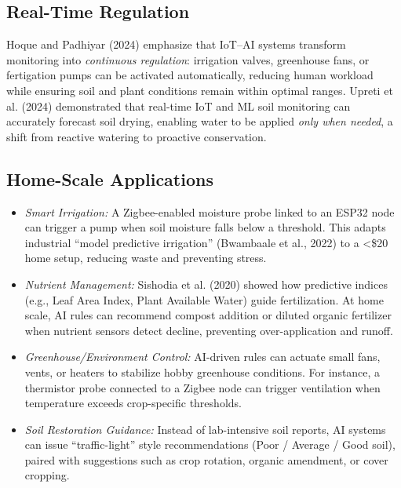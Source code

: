 \documentclass{sigchi}
\begin{document}
\subsection{Real-Time Regulation}

Hoque and Padhiyar (2024) emphasize that IoT–AI systems transform monitoring into \emph{continuous regulation}: irrigation valves, greenhouse fans, or fertigation pumps can be activated automatically, reducing human workload while ensuring soil and plant conditions remain within optimal ranges.
Upreti et al. (2024) demonstrated that real-time IoT and ML soil monitoring can accurately forecast soil drying, enabling water to be applied \emph{only when needed}, a shift from reactive watering to proactive conservation.

\subsection{Home-Scale Applications}

\begin{itemize}
\item \emph{Smart Irrigation:} A Zigbee-enabled moisture probe linked to an ESP32 node can trigger a pump when soil moisture falls below a threshold. This adapts industrial “model predictive irrigation” (Bwambaale et al., 2022) to a <\$20 home setup, reducing waste and preventing stress.
\item \emph{Nutrient Management:} Sishodia et al. (2020) showed how predictive indices (e.g., Leaf Area Index, Plant Available Water) guide fertilization. At home scale, AI rules can recommend compost addition or diluted organic fertilizer when nutrient sensors detect decline, preventing over-application and runoff.
\item \emph{Greenhouse/Environment Control:} AI-driven rules can actuate small fans, vents, or heaters to stabilize hobby greenhouse conditions. For instance, a thermistor probe connected to a Zigbee node can trigger ventilation when temperature exceeds crop-specific thresholds.
\item \emph{Soil Restoration Guidance:} Instead of lab-intensive soil reports, AI systems can issue “traffic-light” style recommendations (Poor / Average / Good soil), paired with suggestions such as crop rotation, organic amendment, or cover cropping.
\end{itemize}
\end{document}
